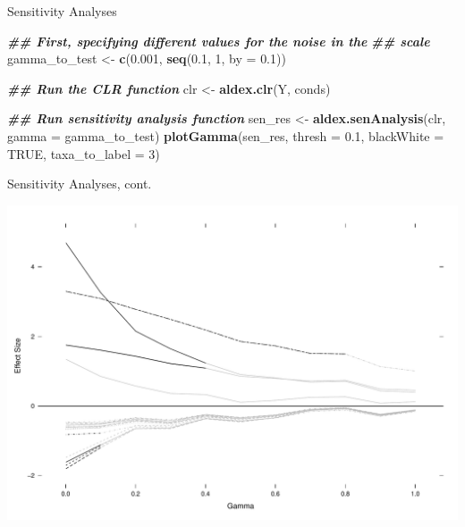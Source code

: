 \documentclass[
  ignorenonframetext,
]{beamer}
\newenvironment{Shaded}{\begin{snugshade}}{\end{snugshade}}
\newcommand{\AttributeTok}[1]{\textcolor[rgb]{0.13,0.29,0.53}{#1}}
\newcommand{\ConstantTok}[1]{\textcolor[rgb]{0.56,0.35,0.01}{#1}}
\newcommand{\DecValTok}[1]{\textcolor[rgb]{0.00,0.00,0.81}{#1}}
\newcommand{\DocumentationTok}[1]{\textcolor[rgb]{0.56,0.35,0.01}{\textbf{\textit{#1}}}}
\newcommand{\FloatTok}[1]{\textcolor[rgb]{0.00,0.00,0.81}{#1}}
\newcommand{\FunctionTok}[1]{\textcolor[rgb]{0.13,0.29,0.53}{\textbf{#1}}}
\newcommand{\NormalTok}[1]{#1}
\newcommand{\OtherTok}[1]{\textcolor[rgb]{0.56,0.35,0.01}{#1}}
\begin{document}
\begin{frame}[fragile]{Sensitivity Analyses}
\protect\hypertarget{sensitivity-analyses-2}{}
\begin{Shaded}
\begin{Highlighting}[]
\DocumentationTok{\#\# First, specifying different values for the noise in the}
\DocumentationTok{\#\# scale}
\NormalTok{gamma\_to\_test }\OtherTok{\textless{}{-}} \FunctionTok{c}\NormalTok{(}\FloatTok{0.001}\NormalTok{, }\FunctionTok{seq}\NormalTok{(}\FloatTok{0.1}\NormalTok{, }\DecValTok{1}\NormalTok{, }\AttributeTok{by =} \FloatTok{0.1}\NormalTok{))}

\DocumentationTok{\#\# Run the CLR function}
\NormalTok{clr }\OtherTok{\textless{}{-}} \FunctionTok{aldex.clr}\NormalTok{(Y, conds)}

\DocumentationTok{\#\# Run sensitivity analysis function}
\NormalTok{sen\_res }\OtherTok{\textless{}{-}} \FunctionTok{aldex.senAnalysis}\NormalTok{(clr, }\AttributeTok{gamma =}\NormalTok{ gamma\_to\_test)}
\FunctionTok{plotGamma}\NormalTok{(sen\_res, }\AttributeTok{thresh =} \FloatTok{0.1}\NormalTok{, }\AttributeTok{blackWhite =} \ConstantTok{TRUE}\NormalTok{, }\AttributeTok{taxa\_to\_label =} \DecValTok{3}\NormalTok{)}
\end{Highlighting}
\end{Shaded}
\end{frame}

\begin{frame}{Sensitivity Analyses, cont.}
\protect\hypertarget{sensitivity-analyses-cont.}{}
\begin{center}\includegraphics[width=0.95\linewidth]{slides_files/figure-beamer/f-1} \end{center}
\end{frame}
\end{document}
